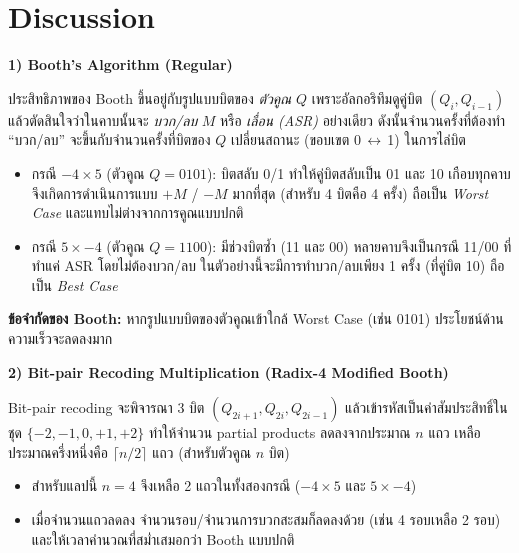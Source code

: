 \documentclass[12pt]{article}
\begin{document}
\section{Discussion}
\sloppy
\textbf{1) Booth's Algorithm (Regular)}

ประสิทธิภาพของ Booth ขึ้นอยู่กับรูปแบบบิตของ \textit{ตัวคูณ} $Q$ เพราะอัลกอริทึมดูคู่บิต
$(Q_i,Q_{i-1})$ แล้วตัดสินใจว่าในคาบนั้นจะ \textit{บวก/ลบ} $M$ หรือ \textit{เลื่อน (ASR)} อย่างเดียว
ดังนั้นจำนวนครั้งที่ต้องทำ ``บวก/ลบ'' จะขึ้นกับจำนวนครั้งที่บิตของ $Q$ เปลี่ยนสถานะ
(ขอบเขต 0\,$\leftrightarrow$\,1) ในการไล่บิต
\begin{itemize}
    \item กรณี $-4\times 5$ (ตัวคูณ $Q=0101$): บิตสลับ 0/1 ทำให้คู่บิตสลับเป็น
    01 และ 10 เกือบทุกคาบ จึงเกิดการดำเนินการแบบ $+M$ / $-M$ มากที่สุด
    (สำหรับ 4 บิตคือ 4 ครั้ง) ถือเป็น \textit{Worst Case} และแทบไม่ต่างจากการคูณแบบปกติ
    \item กรณี $5\times -4$ (ตัวคูณ $Q=1100$): มีช่วงบิตซ้ำ (11 และ 00)
    หลายคาบจึงเป็นกรณี 11/00 ที่ทำแค่ ASR โดยไม่ต้องบวก/ลบ
    ในตัวอย่างนี้จะมีการทำบวก/ลบเพียง 1 ครั้ง (ที่คู่บิต 10)
    ถือเป็น \textit{Best Case}
\end{itemize}

\textbf{ข้อจำกัดของ Booth:} หากรูปแบบบิตของตัวคูณเข้าใกล้ Worst Case (เช่น 0101)
ประโยชน์ด้านความเร็วจะลดลงมาก

\medskip
\textbf{2) Bit-pair Recoding Multiplication (Radix-4 Modified Booth)}

Bit-pair recoding จะพิจารณา 3 บิต $(Q_{2i+1},Q_{2i},Q_{2i-1})$ แล้วเข้ารหัสเป็นค่าสัมประสิทธิ์ในชุด
$\{-2,-1,0,+1,+2\}$ ทำให้จำนวน partial products ลดลงจากประมาณ $n$ แถว
เหลือประมาณครึ่งหนึ่งคือ $\lceil n/2 \rceil$ แถว (สำหรับตัวคูณ $n$ บิต)
\begin{itemize}
    \item สำหรับแลปนี้ $n=4$ จึงเหลือ 2 แถวในทั้งสองกรณี ($-4\times 5$ และ $5\times -4$)
    \item เมื่อจำนวนแถวลดลง จำนวนรอบ/จำนวนการบวกสะสมก็ลดลงด้วย (เช่น 4 รอบเหลือ 2 รอบ)
    และให้เวลาคำนวณที่สม่ำเสมอกว่า Booth แบบปกติ
\end{itemize}

\fussy
\end{document}
